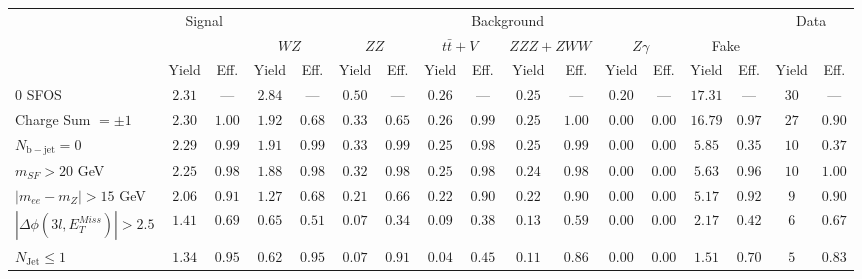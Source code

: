 \begin{tabular}{l||c|c||c|c||c|c||c|c||c|c||c|c||c|c||c|c}
\hline
 &                 \multicolumn{2}{c||}{Signal}            &  \multicolumn{12}{c||}{Background} &  \multicolumn{2}{c}{Data} \\
 & &  & \multicolumn{2}{c||}{$WZ$} & \multicolumn{2}{c||}{$ZZ$} & \multicolumn{2}{c||}{$t\bar{t}+V$} & \multicolumn{2}{c||}{$ZZZ+ZWW$} & \multicolumn{2}{c||}{$Z\gamma$} & \multicolumn{2}{c||}{Fake} &  & \\ 
 & Yield & Eff. & Yield & Eff. & Yield & Eff. & Yield & Eff. & Yield & Eff. & Yield & Eff. & Yield & Eff. & Yield & Eff.\\
\hline\hline
0 SFOS &  $2.31$ &  --- &  $2.84$ &  --- &  $0.50$ &  --- &  $0.26$ &  --- &  $0.25$ &  --- &  $0.20$ &  --- &  $17.31$ &  --- & $30$ &  ---\\ 
\hline
Charge Sum $= \pm 1$ &  $2.30$ &  $1.00$ &  $1.92$ &  $0.68$ &  $0.33$ &  $0.65$ &  $0.26$ &  $0.99$ &  $0.25$ &  $1.00$ &  $0.00$ &  $0.00$ &  $16.79$ &  $0.97$ & $27$ &  $0.90$\\ 
\hline
$N_{\mathrm{b-jet}} = 0$ &  $2.29$ &  $0.99$ &  $1.91$ &  $0.99$ &  $0.33$ &  $0.99$ &  $0.25$ &  $0.98$ &  $0.25$ &  $0.99$ &  $0.00$ &  $0.00$ &  $5.85$ &  $0.35$ & $10$ &  $0.37$\\ 
\hline
$m_{SF} > 20$ GeV &  $2.25$ &  $0.98$ &  $1.88$ &  $0.98$ &  $0.32$ &  $0.98$ &  $0.25$ &  $0.98$ &  $0.24$ &  $0.98$ &  $0.00$ &  $0.00$ &  $5.63$ &  $0.96$ & $10$ &  $1.00$\\ 
\hline
$|m_{ee} - m_{Z}| > 15$ GeV &  $2.06$ &  $0.91$ &  $1.27$ &  $0.68$ &  $0.21$ &  $0.66$ &  $0.22$ &  $0.90$ &  $0.22$ &  $0.90$ &  $0.00$ &  $0.00$ &  $5.17$ &  $0.92$ & $9$ &  $0.90$\\ 
\hline
$|\Delta\phi(3l,E_{T}^{Miss})| > 2.5$ &  $1.41$ &  $0.69$ &  $0.65$ &  $0.51$ &  $0.07$ &  $0.34$ &  $0.09$ &  $0.38$ &  $0.13$ &  $0.59$ &  $0.00$ &  $0.00$ &  $2.17$ &  $0.42$ & $6$ &  $0.67$\\ 
\hline
$N_{\mathrm{Jet}} \leq 1$ &  $1.34$ &  $0.95$ &  $0.62$ &  $0.95$ &  $0.07$ &  $0.91$ &  $0.04$ &  $0.45$ &  $0.11$ &  $0.86$ &  $0.00$ &  $0.00$ &  $1.51$ &  $0.70$ & $5$ &  $0.83$\\ 
\hline
\end{tabular}



